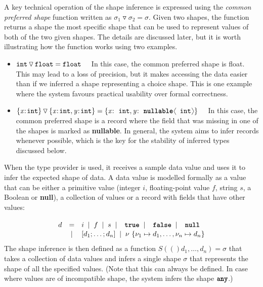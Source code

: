 \documentclass[fleqn,11pt]{report}
\newcommand{\lsep}[0]{\;\; | \;\;}
\newcommand{\kvd}[1]{\textnormal{\ttfamily\bfseries #1}}
\newcommand{\ident}[1]{\textnormal{\ttfamily #1}}
\newcommand{\langl}{\begin{picture}(4.5,7)
\put(1.1,2.5){\rotatebox{60}{\line(1,0){5.5}}}
\put(1.1,2.5){\rotatebox{300}{\line(1,0){5.5}}}
\end{picture}}
\newcommand{\rangl}{\begin{picture}(4.5,7)
\put(.9,2.5){\rotatebox{120}{\line(1,0){5.5}}}
\put(.9,2.5){\rotatebox{240}{\line(1,0){5.5}}}
\end{picture}}
\theoremstyle{definition}
\newcommand{\semalt}[1]{S(#1)}
\newenvironment{nitemize}
{ \vspace{-0.4em}
  \begin{itemize}
    \setlength{\itemsep}{5pt}
    \setlength{\parskip}{0pt}
    \setlength{\parsep}{0pt} }
{ \end{itemize}
  \vspace{-0.4em} }
\begin{document}
A key technical operation of the shape inference is expressed using the \emph{common preferred shape}
function written as $\sigma_1 \triangledown \sigma_2 = \sigma$. Given two shapes, the function
returns a shape the most specific shape that can be used to represent values of both of the two
given shapes. The details are discussed later, but it is worth illustrating how the function works
using two examples.

\begin{nitemize}
\item $\ident{int} \,\triangledown\, \ident{float} = \ident{float}\quad$ In this case, the common
  preferred shape is \ident{float}. This may lead to a loss of precision, but it makes accessing
  the data easier than if we inferred a shape representing a choice shape. This is one example
  where the system favours practical usability over formal correctness.
\item $\{ \textit{x} \!:\! \ident{int} \} \,\triangledown\,
  \{ \textit{x} \!:\! \ident{int}, \textit{y} \!:\! \ident{int} \} =
  \{ \textit{x} \!:\! \ident{int}, \textit{y} \!:\! \kvd{nullable}\langl\ident{int}\rangl \}\quad$
  In this case, the common preferred shape is a record where the field that was missing in one
  of the shapes is marked as \kvd{nullable}. In general, the system aims to infer records whenever
  possible, which is the key for the stability of inferred types discussed below.
\end{nitemize}

When the type provider is used, it receives a sample data value and uses it to infer the expected
shape of data. A data value is modelled formally as a value that can be either a primitive value
(integer $i$, floating-point value $f$, string $s$, a Boolean or \kvd{null}), a collection of values
or a record with fields that have other values:
%
\begin{equation*}
\begin{array}{lcl}
  \\[-0.5em]
 d &=& i \lsep f \lsep s \lsep \kvd{true} \lsep \kvd{false} \lsep \kvd{null} \\[0.1em]
   &|& [d_1; \ldots; d_n] \lsep \nu~\{ \nu_1 \mapsto d_1, \ldots, \nu_n \mapsto d_n \}
\end{array}
\end{equation*}
%
The shape inference is then defined as a function $\semalt(d_1, \ldots, d_n)=\sigma$ that takes a
collection of data values and infers a single shape $\sigma$ that represents the shape of all the
specified values. (Note that this can always be defined. In case where values are of incompatible
shape, the system infers the shape $\kvd{any}$.)
\end{document}
